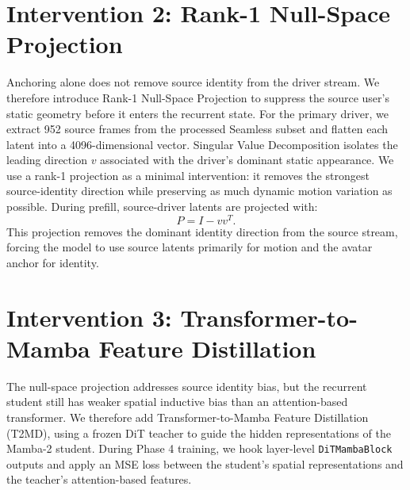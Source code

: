 \documentclass[12pt,letterpaper]{report}
\begin{document}
\section{Intervention 2: Rank-1 Null-Space Projection}

Anchoring alone does not remove source identity from the driver stream. We therefore introduce Rank-1 Null-Space Projection to suppress the source user's static geometry before it enters the recurrent state. For the primary driver, we extract 952 source frames from the processed Seamless subset and flatten each latent into a 4096-dimensional vector. Singular Value Decomposition isolates the leading direction $v$ associated with the driver's dominant static appearance. We use a rank-1 projection as a minimal intervention: it removes the strongest source-identity direction while preserving as much dynamic motion variation as possible. During prefill, source-driver latents are projected with:
\[
    P = I - vv^T.
\]
This projection removes the dominant identity direction from the source stream, forcing the model to use source latents primarily for motion and the avatar anchor for identity.

\section{Intervention 3: Transformer-to-Mamba Feature Distillation}

The null-space projection addresses source identity bias, but the recurrent student still has weaker spatial inductive bias than an attention-based transformer. We therefore add Transformer-to-Mamba Feature Distillation (T2MD), using a frozen DiT teacher to guide the hidden representations of the Mamba-2 student. During Phase 4 training, we hook layer-level \texttt{DiTMambaBlock} outputs and apply an MSE loss between the student's spatial representations and the teacher's attention-based features.
\end{document}
